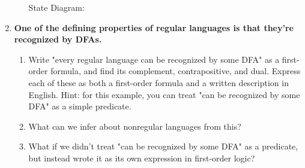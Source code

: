 \begin{enumerate}
\begin{enumerate}
  State Diagram:\\
\end{enumerate}


\newpage
\item \textbf{One of the defining properties of regular languages is that they're recognized by DFAs.}
\begin{enumerate}
  \item Write "every regular language can be recognized by some DFA" as a first-order formula, and find its complement, contrapositive, and dual. Express each of these as both a first-order formula and a written description in English. Hint: for this example, you can treat "can be recognized by some DFA" as a simple predicate.
  \item What can we infer about nonregular languages from this?
  \item What if we didn't treat "can be recognized by some DFA" as a predicate, but instead wrote it as its own expression in first-order logic?
\end{enumerate}
		
\end{enumerate}


